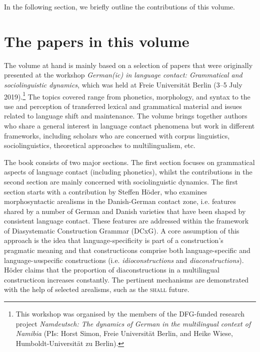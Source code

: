 \documentclass[output=paper]{langsci/langscibook}
\begin{document}
In the following section, we briefly outline the contributions of this volume. 

\section{The papers in this volume} %
\label{sec:zimmer:2}

The volume at hand is mainly based on a selection of papers that were originally presented at the workshop \textit{German(ic) in language contact: Grammatical and sociolinguistic dynamics}, which was held at Freie Universität Berlin (3--5 July 2019).\footnote{This workshop was organised by the members of the DFG-funded research project \textit{Namdeutsch: The dynamics of German in the multilingual context of Namibia} (PIs: Horst Simon, Freie Universität Berlin, and Heike Wiese, Humboldt-Universität zu Berlin).} The topics covered range from phonetics, morphology, and syntax to the use and perception of transferred lexical and grammatical material and issues related to language shift and maintenance. The volume brings together authors who share a general interest in language contact phenomena but work in different frameworks, including scholars who are concerned with corpus linguistics, sociolinguistics, theoretical approaches to multilingualism, etc. 

\begin{sloppypar}
The book consists of two major sections. The first section focuses on grammatical aspects of language contact (including phonetics), whilst the contributions in the second section are mainly concerned with sociolinguistic dynamics. The first section starts with a contribution by {Steffen} {Höder,} who examines morphosyntactic arealisms in the Danish-German contact zone, i.e. features shared by a number of German and Danish varieties that have been shaped by consistent language contact. These features are addressed within the framework of Diasystematic Construction Grammar (DCxG). A core assumption of this approach is the idea that language-specificity is part of a construction’s pragmatic meaning and that constructicons comprise both language-specific and language-\textit{un}specific constructions (i.e. \textit{idioconstructions} and \textit{diaconstructions}). Höder claims that the proportion of diaconstructions in a multilingual constructicon increases constantly. The pertinent mechanisms are demonstrated with the help of selected arealisms, such as the \textsc{shall} future. 
\end{sloppypar}
\end{document}
